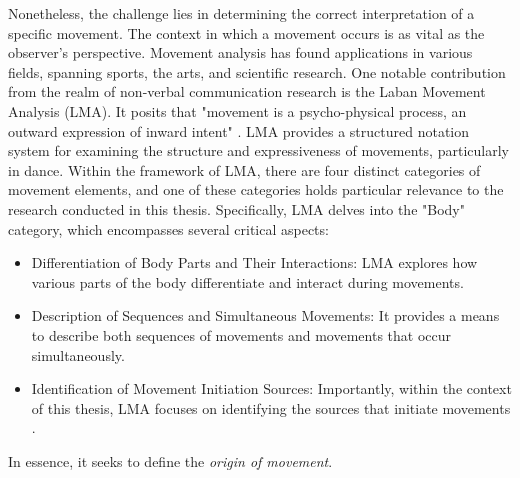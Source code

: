 Nonetheless, the challenge lies in determining the correct interpretation of a specific movement. 
The context in which a movement occurs is as vital as the observer's perspective. 
Movement analysis has found applications in various fields, spanning sports, the arts, and scientific research. 
One notable contribution from the realm of non-verbal communication research is the Laban Movement Analysis (LMA). 
It posits that "movement is a psycho-physical process, an outward expression of inward intent" \cite{Groff1995LabanMA}. 
LMA provides a structured notation system for examining the structure and expressiveness of movements, particularly in dance.
Within the framework of LMA, there are four distinct categories of movement elements, and one of these categories holds particular relevance to the research conducted in this thesis. 
Specifically, LMA delves into the "Body" category, which encompasses several critical aspects:
\begin{itemize}
    \item Differentiation of Body Parts and Their Interactions: LMA explores how various parts of the body differentiate and interact during movements.
    \item Description of Sequences and Simultaneous Movements: It provides a means to describe both sequences of movements and movements that occur simultaneously.  
    \item Identification of Movement Initiation Sources: Importantly, within the context of this thesis, LMA focuses on identifying the sources that initiate movements \cite{zhao2001synthesis}.
\end{itemize}
In essence, it seeks to define the \textit{origin of movement}.
    
